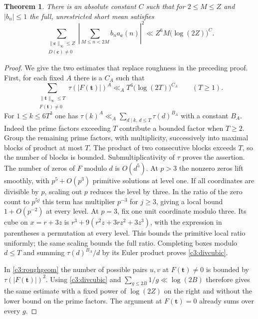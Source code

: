 \documentclass[11pt,letterpaper]{article}
\newtheorem{theorem}{Theorem}[section]
\theoremstyle{definition}
\begin{document}
\begin{theorem}\label{c3:fullshortmean}
There is an absolute constant $C$ such that for $2\le M\le Z$ and
$|b_n|\le1$ the full, unrestricted short mean satisfies
\[
 \sum_{\substack{\|\mathbf c\|_\infty\le Z\\D(\mathbf c)\ne0}}
 \left|\sum_{M\le n<2M} b_n a_{\mathbf c}(n)\right|^2
          \ll Z^6M\big(\log(2Z)\big)^C .
\]
\end{theorem}
\begin{proof}
We give the two estimates that replace roughness in the preceding
proof. First, for each fixed $A$ there is a $C_A$ such that
\begin{equation}\label{c3:divcubic}
 \sum_{\substack{\|\mathbf t\|_\infty\le T\\F(\mathbf t)\ne0}}
   \tau(|F(\mathbf t)|)^A \ll_A T^6\big(\log(2T)\big)^{C_A}
       \qquad(T\ge1).
\end{equation}
For $1\le k\le 6T^3$ one has
$\tau(k)^A\ll_A\sum_{d\mid k,\, d\le T}\tau(d)^{B_A}$ with
a constant $B_A$. Indeed the prime factors exceeding $T$ contribute
a bounded factor when $T\ge 2$. Group the remaining prime factors,
with multiplicity, successively into maximal blocks of product at
most $T$. The product of two consecutive blocks exceeds $T$, so
the number of blocks is bounded. Submultiplicativity of $\tau$
proves the assertion. The number of zeros of $F$ modulo $d$ is
$O(d^5)$. At $p>3$ the nonzero zeros lift smoothly, with
$p^5+O(p^3)$ primitive solutions at level one. If all coordinates
are divisible by $p$, scaling out $p$ reduces the level by three.
In the ratio of the zero count to $p^{5j}$ this term has multiplier
$p^{-3}$ for $j\ge3$, giving a local bound $1+O(p^{-2})$ at every
level. At $p=3$, fix one unit coordinate modulo three. Its cube
on $x=r+3z$ is $r^3+9(r^2z+3rz^2+3z^3)$, with the expression in
parentheses a permutation at every level. This bounds the primitive
local ratio uniformly; the same scaling bounds the full ratio.
Completing boxes modulo $d\le T$ and summing $\tau(d)^{B_A}/d$
by its Euler product proves \eqref{c3:divcubic}.

In \eqref{c3:roughgeom} the number of possible pairs $u,v$ at
$F(\mathbf t)\ne0$ is bounded by $\tau(|F(\mathbf t)|)^2$.
Using \eqref{c3:divcubic} and $\sum_{g\le2B}1/g\ll\log(2B)$
therefore gives the same estimate with a fixed power of $\log(2Z)$
on the right and without the lower bound on the prime factors.
The argument at $F(\mathbf t)=0$ already sums over every $g$.


\end{proof}
\end{document}
